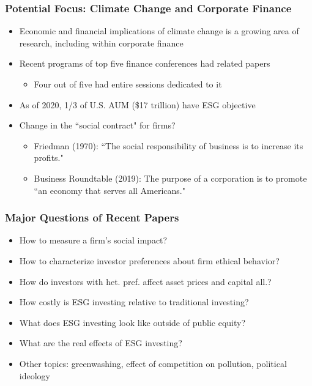 \documentclass[usenames,dvipsnames, handout]{beamer}
\begin{document}
\begin{frame}[label=cfcc]
\small
\frametitle{Potential Focus: Climate Change and Corporate Finance}
\begin{itemize}[<+->]
\item Economic and financial implications of climate change is a growing area of research, including within corporate finance
\bigskip
\item Recent programs of top five finance conferences had related papers 
\begin{itemize}[<+->]
\item Four out of five had entire sessions dedicated to it \hyperlink{methodology}{}
\end{itemize}
\bigskip
\item As of 2020, 1/3 of U.S. AUM (\$17 trillion) have ESG objective \hyperlink{terminology}{}
\bigskip
\item Change in the ``social contract" for firms?
\begin{itemize}
\item Friedman (1970): ``The social responsibility of business is to increase its profits."
\item Business Roundtable (2019): The purpose of a corporation is to promote ``an economy that serves all Americans."
\end{itemize}

\end{itemize}
\end{frame}



\begin{frame}[label=mq]
\frametitle{Major Questions of Recent Papers}
\small
\begin{itemize}[<+->] 
\item How to measure a firm's social impact? \hyperlink{q_1}{}
\bigskip
\item How to characterize investor preferences about firm ethical behavior?  \hyperlink{q_2}{}
\bigskip
\item How do investors with het. pref. affect asset prices and capital all.?  \hyperlink{q_3}{}
\bigskip
\item How costly is ESG investing relative to traditional investing? \hyperlink{q_4}{}
\bigskip
\item What does ESG investing look like outside of public equity? \hyperlink{q_5}{}
\bigskip
\item What are the real effects of ESG investing? \hyperlink{q_6}{}
\bigskip
\item Other topics: greenwashing, effect of competition on pollution, political ideology \hyperlink{q_o}{}
\end{itemize}
\end{frame}
\end{document}
